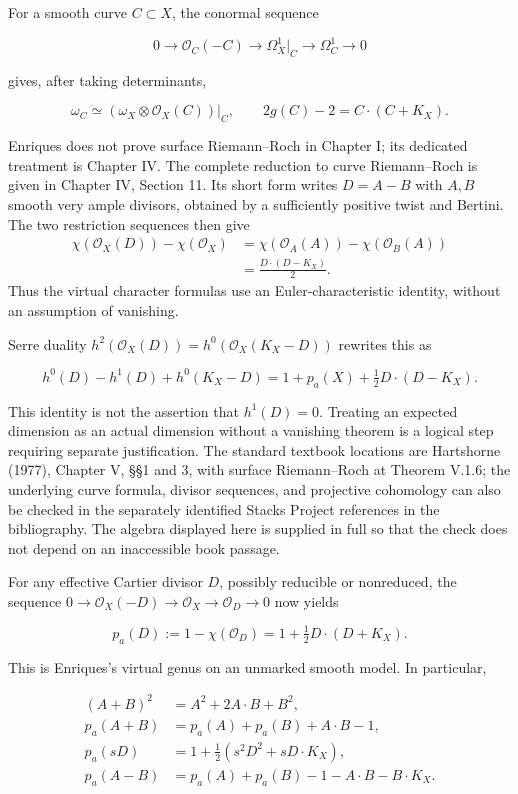 For a smooth curve \(C\subset X\), the conormal sequence

\[
0\to\mathcal O_C(-C)\to\Omega_X^1|_C\to\Omega_C^1\to0
\]

gives, after taking determinants,

\[
\omega_C\simeq(\omega_X\otimes\mathcal O_X(C))|_C,\qquad
2g(C)-2=C\cdot(C+K_X).
\]

Enriques does not prove surface Riemann--Roch in Chapter I; its dedicated treatment is Chapter IV. The complete reduction to curve Riemann--Roch is given in Chapter IV, Section 11. Its short form writes \(D=A-B\) with \(A,B\) smooth very ample divisors, obtained by a sufficiently positive twist and Bertini. The two restriction sequences then give
\[
\begin{aligned}
\chi(\mathcal O_X(D))-\chi(\mathcal O_X)
 &=\chi(\mathcal O_A(A))-\chi(\mathcal O_B(A))\\
 &=\frac{D\cdot(D-K_X)}2.
\end{aligned}
\]
Thus the virtual character formulas use an Euler-characteristic identity, without an assumption of vanishing.

Serre duality \(h^2(\mathcal O_X(D))=h^0(\mathcal O_X(K_X-D))\) rewrites this as

\[
h^0(D)-h^1(D)+h^0(K_X-D)
=1+p_a(X)+\tfrac12D\cdot(D-K_X).
\]

This identity is not the assertion that \(h^1(D)=0\). Treating an expected dimension as an actual dimension without a vanishing theorem is a logical step requiring separate justification. The standard textbook locations are Hartshorne (1977), Chapter V, §§1 and 3, with surface Riemann--Roch at Theorem V.1.6; the underlying curve formula, divisor sequences, and projective cohomology can also be checked in the separately identified Stacks Project references in the bibliography. The algebra displayed here is supplied in full so that the check does not depend on an inaccessible book passage.

For any effective Cartier divisor \(D\), possibly reducible or nonreduced, the sequence \(0\to\mathcal O_X(-D)\to\mathcal O_X\to\mathcal O_D\to0\) now yields

\[
\boxed{p_a(D):=1-\chi(\mathcal O_D)=1+\tfrac12D\cdot(D+K_X).}
\]

This is Enriques's virtual genus on an unmarked smooth model. In particular,

\[
\begin{aligned}
(A+B)^2&=A^2+2A\cdot B+B^2,\\
p_a(A+B)&=p_a(A)+p_a(B)+A\cdot B-1,\\
p_a(sD)&=1+\tfrac12(s^2D^2+sD\cdot K_X),\\
p_a(A-B)&=p_a(A)+p_a(B)-1-A\cdot B-B\cdot K_X.
\end{aligned}
\]

